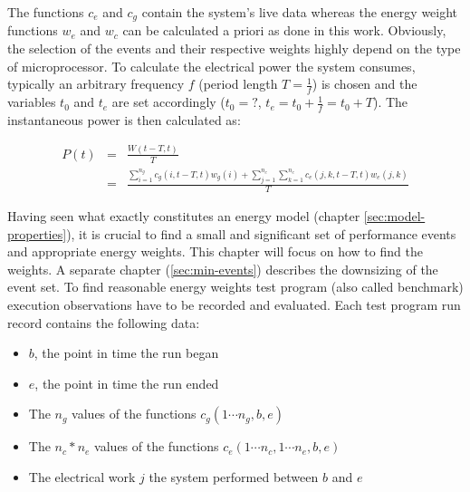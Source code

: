 The functions $c_e$ and $c_g$ contain the system's live data whereas the energy
weight functions $w_e$ and $w_c$ can be calculated a priori as done in this
work. Obviously, the selection of the events and their respective weights highly
depend on the type of microprocessor. To calculate the electrical power the
system consumes, typically an arbitrary frequency $f$ (period length $T =
\frac{1}{f}$) is chosen and the variables $t_0$ and $t_e$ are set accordingly
($t_0 = ?$, $t_e = t_0 + \frac{1}{f} = t_0 + T$). The instantaneous power is
then calculated as:

\begin{eqnarray}
P(t) & = & \frac{W(t - T, t)}{T} \\
     & = & \frac{\sum\limits_{i=1}^{n_g} c_g(i, t - T, t) w_g(i) +
                 \sum\limits_{j=1}^{n_c}
                 \sum\limits_{k=1}^{n_e} c_e(j, k, t - T, t) w_e(j, k)
                }{T}
\end{eqnarray}


\label{sec:finding-weights}

Having seen what exactly constitutes an energy model (chapter
\ref{sec:model-properties}), it is crucial to find a small and significant set
of performance events and appropriate energy weights. This chapter will focus on
how to find the weights. A separate chapter (\ref{sec:min-events}) describes the
downsizing of the event set. To find reasonable energy weights test
program (also called benchmark) execution observations have to be recorded and
evaluated. Each test program run record contains the following data:

\begin{itemize}

\item $b$, the point in time the run began

\item $e$, the point in time the run ended

\item The $n_g$ values of the functions $c_g(1 \cdots n_g, b, e)$

\item The $n_c * n_e$ values of the functions
$c_e(1 \cdots n_c, 1 \cdots n_e, b, e)$

\item The electrical work $j$ the system performed between $b$ and $e$

\end{itemize}

